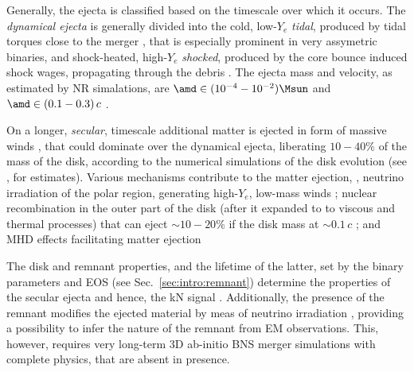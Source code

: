 Generally, the ejecta is classified based on the timescale over which it occurs. 
The \textit{dynamical ejecta} is generally divided into 
the cold, low-$Y_e$ \textit{tidal}, produced by tidal torques close to the merger 
\cite{Rosswog:1998hy,Radice:2016dwd,Dietrich:2016hky}, that 
is especially prominent in very assymetric binaries, and shock-heated, high-$Y_e$
\textit{shocked}, produced 
by the core bounce induced shock wages, propagating through the \pmerg{} debris 
\cite{Hotokezaka:2013b, Bauswein:2013yna, Sekiguchi:2016bjd, Dietrich:2016hky, Radice:2018pdn}. The ejecta mass and velocity, as estimated by \ac{NR} 
simalations, are $\amd\in(10^{-4}-10^{-2})\Msun$ and $\amd\in(0.1-0.3)\,c$ 
\cite{Hotokezaka:2013b,Bauswein:2013yna,Sekiguchi:2016bjd,Radice:2018pdn}.

On a longer, \textit{secular}, timescale additional matter is ejected in form of 
massive winds \cite{Lee:2009, Perego:2014fma, Fernandez:2015use, Siegel:2017nub, Fujibayashi:2017puw, Fernandez:2018kax, Miller:2019dpt},%
that could dominate over the 
dynamical ejecta, liberating $10-40\%$ of the mass of the disk, 
according to the numerical simulations of the disk evolution (see \eg, \cite{Radice:2018pdn} for estimates).
Various mechanisms contribute to the matter ejection, \eg, 
neutrino irradiation of the polar region, generating high-$Y_e$, low-mass winds \cite{Perego:2014fma,Miller:2019dpt}; 
nuclear recombination in the outer part of the disk (after it expanded to to viscous 
and thermal processes) that can eject ${\sim}10-20\%$ if the disk mass at ${\sim}0.1\,c$ \cite{Lee:2009,Fernandez:2015use,Fahlman:2018llv};
and \ac{MHD} effects facilitating matter ejection \cite{Fujibayashi:2017puw,Radice:2018xqa}

The \pmerg{} disk and remnant properties, and the lifetime of the latter, set by the 
binary parameters and \ac{EOS} (see Sec.~\ref{sec:intro:remnant}) \cite{Radice:2018xqa,Perego:2019adq} determine the 
properties of the secular ejecta and hence, the \ac{kN} signal \citep[\eg][]{Radice:2018pdn}.
Additionally, the presence of the remnant modifies the ejected material by meas of 
neutrino irradiation \cite{Fernandez:2015use}, providing a possibility to infer the nature of the remnant 
from \ac{EM} observations. This, however, requires very long-term 3D ab-initio \ac{BNS} merger 
simulations with complete physics, that are absent in presence.

